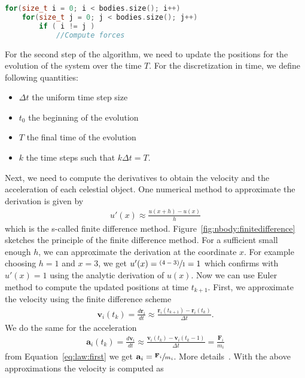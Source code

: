 \documentclass[11pt,fleqn]{book} %
\begin{document}
\begin{lstlisting}[language=c++,caption={Example for the so-called direct sum\index{direct sum}.\label{code:directsum}},float,floatplacement=tb]
for(size_t i = 0; i < bodies.size(); i++)
	for(size_t j = 0; j < bodies.size(); j++)
		if ( i != j )
			//Compute forces
\end{lstlisting}

For the second step of the algorithm, we need to update the positions for the evolution of the system over the time $T$. For the discretization in time, we define following quantities:
\begin{itemize}
\item $\Delta t$ the uniform time step size
\item $t_0$ the beginning of the evolution
\item $T$ the final time of the evolution
\item $k$ the time steps such that $k\Delta t=T$.
\end{itemize}
Next, we need to compute the derivatives to obtain the velocity and the acceleration of each celestial object. One numerical method to approximate the derivation is given by
\begin{align}
u'(x) \approx \frac{u(x+h)-u(x)}{h}
\end{align}
which is the s-called finite difference method. Figure~\ref{fig:nbody:finitedifference} sketches the principle of the finite difference method. For a sufficient small enough $h$, we can approximate the derivation at the coordinate $x$. For example choosing $h=1$ and $x=3$, we get $u'(x)=\sfrac{(4-3)}{1}=1$ which confirms with $u'(x)=1$ using the analytic derivation of $u(x)$. Now we can use Euler method to compute the updated positions at time $t_{k+1}$. First, we approximate the velocity using the finite difference scheme
\begin{align}
\mathbf{v}_i(t_k) = \frac{d\mathbf{r}_i}{dt} \approx \frac{\mathbf{r}_i(t_{k+1})-\mathbf{r}_i(t_k)}{\Delta t}\label{eq:vel}\text{.}
\end{align}
We do the same for the acceleration
\begin{align}
\mathbf{a}_i(t_k) = \frac{d\mathbf{v}_i}{dt}   \approx  \frac{\mathbf{v}_i(t_k)-\mathbf{v}_i(t_k-1)}{\Delta t} = \frac{\mathbf{F}_i}{m_i}  \label{eq:acc} 
\end{align}
from Equation~\ref{eq:law:first} we get $\mathbf{a}_i=\sfrac{\mathbf{F}_i}{m_i}$. More details~\cite{strikwerda2004finite,leveque2007finite,euler1824institutionum}. With the above approximations the velocity is computed as
\end{document}
